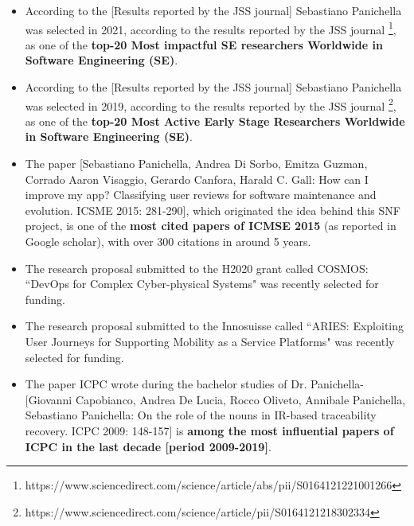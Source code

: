 \documentclass[12pt]{article}
\begin{document}
\vspace{-2.5mm}
\begin{itemize}
  \item According to the [Results reported by the JSS journal] Sebastiano Panichella was selected in 2021, according to the results reported by the JSS journal \footnote{https://www.sciencedirect.com/science/article/abs/pii/S0164121221001266}, as one of the \textbf{top-20 Most impactful SE researchers Worldwide in Software Engineering (SE)}. 
  \item According to the [Results reported by the JSS journal] Sebastiano Panichella was selected in 2019, according to the results reported by the JSS journal \footnote{https://www.sciencedirect.com/science/article/pii/S0164121218302334}, as one of the \textbf{top-20 Most Active Early Stage Researchers Worldwide in Software Engineering (SE)}. 
\vspace{-1.5mm}
  \item The paper [Sebastiano Panichella, Andrea Di Sorbo, Emitza Guzman, Corrado Aaron Visaggio, Gerardo Canfora, Harald C. Gall: How can I improve my app? Classifying user reviews for software maintenance and evolution. ICSME 2015: 281-290], which originated the idea behind this SNF project, is one of the \textbf{most cited papers of ICMSE 2015} (as reported in Google scholar), with over 300 citations in around 5 years.
  \item The research proposal submitted to the H2020 grant called COSMOS: ``DevOps for Complex Cyber-physical Systems" was recently selected for funding.
  \item The research proposal submitted to the Innosuisse called ``ARIES: Exploiting User Journeys for Supporting Mobility as a Service Platforms" was recently selected for funding.
\vspace{-1.5mm}
  \item The paper ICPC wrote during the bachelor studies of Dr. Panichella-[Giovanni Capobianco, Andrea De Lucia, Rocco Oliveto, Annibale Panichella, Sebastiano Panichella: On the role of the nouns in IR-based traceability recovery. ICPC 2009: 148-157] is \textbf{among the most influential papers of ICPC in the last decade [period 2009-2019]}.
  \vspace{-1.5mm}
\end{itemize}
\end{document}
